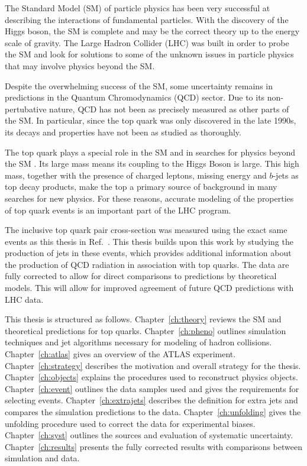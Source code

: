 The Standard Model (SM) of particle physics has been very successful at describing the interactions of fundamental particles. With the discovery of the Higgs boson, the SM is complete and may be the correct theory up to the energy scale of gravity. The Large Hadron Collider (LHC) was built in order to probe the SM and look for solutions to some of the unknown issues in particle physics that may involve physics beyond the SM.

Despite the overwhelming success of the SM, some uncertainty remains in predictions in the Quantum Chromodynamics (QCD) sector. Due to its non-pertubative nature, QCD has not been as precisely measured as other parts of the SM. In particular, since the top quark was only discovered in the late 1990s, its decays and properties have not been as studied as thoroughly. 

The top quark plays a special role in the SM and in searches for
physics beyond the SM .  Its large mass means its coupling to the
Higgs Boson is large.  This high mass, together with the presence of 
charged leptons, missing energy and $b$-jets as top decay products,
make the top a primary source of background in many searches for new physics.
For these reasons, accurate modeling of the properties of top quark
events is an important part of the LHC program.

The inclusive top quark pair cross-section was measured using the exact same events as this thesis in Ref.~\cite{xsec}. This thesis builds upon this work by studying the production of jets in these events, which provides additional information about the production of QCD radiation in association with top quarks. The data are fully corrected to allow for direct comparisons to predictions by theoretical models. This will allow for improved agreement of future QCD predictions with LHC data.

This thesis is structured as follows. Chapter~\ref{ch:theory} reviews the SM and theoretical predictions for top quarks. Chapter~\ref{ch:pheno} outlines simulation techniques and jet algorithms necessary for modeling of hadron collisions. Chapter~\ref{ch:atlas} gives an overview of the ATLAS experiment. Chapter~\ref{ch:strategy} describes the motivation and overall strategy for the thesis. Chapter~\ref{ch:objects} explains the procedures used to reconstruct physics objects. Chapter~\ref{ch:event} outlines the data samples used and gives the requirements for selecting events. Chapter~\ref{ch:extrajets} describes the definition for extra jets and compares the simulation predictions to the data. Chapter~\ref{ch:unfolding} gives the unfolding procedure used to correct the data for experimental biases. Chapter~\ref{ch:syst} outlines the sources and evaluation of systematic uncertainty. Chapter~\ref{ch:results} presents the fully corrected results with comparisons between simulation and data.
